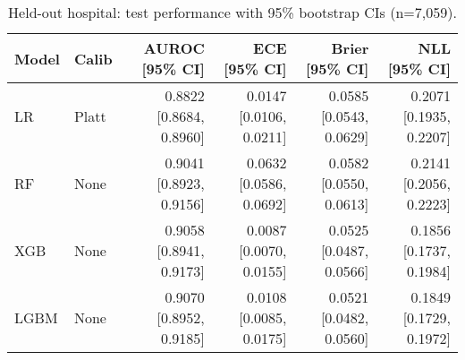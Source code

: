 \begin{table}[H]
\centering
\caption{Held-out hospital: test performance with 95\% bootstrap CIs (n=7,059).}
\label{tab:heldout-hosp-ci}
\begin{tabular}{l l r r r r}
\toprule
Model & Calib & AUROC [95\% CI] & ECE [95\% CI] & Brier [95\% CI] & NLL [95\% CI] \\
\midrule
LR & Platt & 0.8822 [0.8684, 0.8960] & 0.0147 [0.0106, 0.0211] & 0.0585 [0.0543, 0.0629] & 0.2071 [0.1935, 0.2207] \\
RF & None & 0.9041 [0.8923, 0.9156] & 0.0632 [0.0586, 0.0692] & 0.0582 [0.0550, 0.0613] & 0.2141 [0.2056, 0.2223] \\
XGB & None & 0.9058 [0.8941, 0.9173] & 0.0087 [0.0070, 0.0155] & 0.0525 [0.0487, 0.0566] & 0.1856 [0.1737, 0.1984] \\
LGBM & None & 0.9070 [0.8952, 0.9185] & 0.0108 [0.0085, 0.0175] & 0.0521 [0.0482, 0.0560] & 0.1849 [0.1729, 0.1972] \\
\bottomrule
\end{tabular}
\end{table}